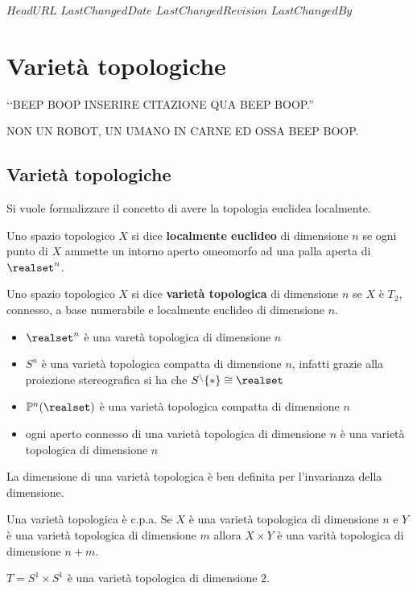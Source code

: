 \svnidlong
{$HeadURL$}
{$LastChangedDate$}
{$LastChangedRevision$}
{$LastChangedBy$}

\chapter{Varietà topologiche}

\begin{introduction}
	‘‘BEEP BOOP INSERIRE CITAZIONE QUA BEEP BOOP.''
	\begin{flushright}
		\textsc{NON UN ROBOT,} UN UMANO IN CARNE ED OSSA BEEP BOOP.
	\end{flushright}
\end{introduction}

\section{Varietà topologiche}
Si vuole formalizzare il concetto di avere la topologia euclidea localmente.
\begin{define}
	Uno spazio topologico $X$ si dice \textbf{localmente euclideo} di dimensione $n$ se ogni punto di $X$ ammette un intorno aperto omeomorfo ad una palla aperta di $\realset^n$.
\end{define}

\begin{define}
	Uno spazio topologico $X$ si dice \textbf{varietà topologica} di dimensione $n$ se $X$ è $T_2$, connesso, a base numerabile e localmente euclideo di dimensione $n$.
\end{define}

\begin{examples}
	\begin{itemize}
		\item $\realset^n$ è una varetà topologica di dimensione $n$
		\item $S^n$ è una varietà topologica compatta di dimensione $n$, infatti grazie alla proiezione stereografica si ha che $S^\setminus\{*\}\cong \realset$
		\item $\mathbb{P}^n(\realset)$ è una varietà topologica compatta di dimensione $n$
		\item ogni aperto connesso di una varietà topologica di dimensione $n$ è una varietà topologica di dimensione $n$
	\end{itemize}
\end{examples}
\begin{observe}
	La dimensione di una varietà topologica è ben definita per l'invarianza della dimensione.
\end{observe}
\begin{observe}
	Una varietà topologica è c.p.a.
	Se $X$ è una varietà topologica di dimensione $n$ e $Y$ è una varietà topologica di dimensione $m$ allora $X\times Y$ è una varità topologica di dimensione $n+m$.
\end{observe}
\begin{example}
	$T=S^1\times S^1$ è una varietà topologica di dimensione $2$.
\end{example}

